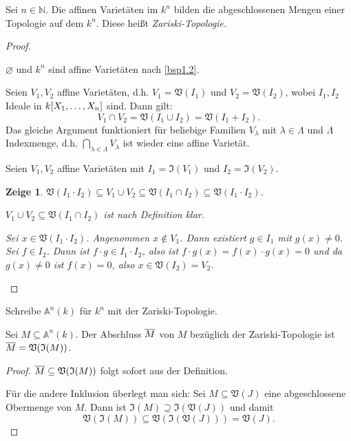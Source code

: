 \documentclass[a4paper,12pt]{scrbook}
\newtheorem{zeige}{Zeige}
\newtheorem{proof}{Beweis}
\def\A{\mathbb{A}}
\def\V{\mathfrak{V}}
\def\I{\mathfrak{I}}
\newcommand{\leer}{\ensuremath{\varnothing}}
\newcommand{\set}[1]{\ensuremath{\mathbb{#1}}}
\newcommand{\N}{\set{N}}
\def\Bar#1{\ensuremath\overline{#1}}
\newcommand{\polyx}[1][n]{\ensuremath%
  [X_{1},\dotsc,X_{#1}]}
\begin{document}
\begin{db}\label{1.2.1}Sei $n\in\N$. Die affinen Varietäten im $k^{n}$ bilden die abgeschlossenen Mengen einer Topologie auf dem $k^{n}$. Diese heißt \emph{Zariski-Topologie}.\end{db}
\begin{proof}\begin{prooflist}
\item $\leer$ und $k^{n}$ sind affine Varietäten nach \cref{bsp1.2}.
\item Seien $V_{1},V_{2}$ affine Varietäten, d.h. $V_{1}=\V(I_{1})$ und $V_{2}=\V(I_{2})$, wobei $I_{1},I_{2}$ Ideale in $k\polyx$ sind. Dann gilt:
\[V_{1}\cap V_{2}=\V(I_{1}\cup I_{2}) = \V(I_{1}+I_{2}).\]
Das gleiche Argument funktioniert für beliebige Familien $V_{\lambda}$ mit $\lambda\in\Lambda$ und $\Lambda$ Indexmenge, d.h. $\displaystyle\bigcap_{\lambda\in\Lambda}V_{\lambda}$ ist wieder eine affine Varietät.
\item Seien $V_{1},V_{2}$ affine Varietäten mit $I_{1}=\I(V_{1})$ und $I_{2}=\I(V_{2})$.
\begin{zeige} $\V(I_{1}\cdot I_{2})\subseteq V_{1}\cup V_{2}\subseteq \V(I_{1}\cap I_{2})\subseteq \V(I_{1}\cdot I_{2})$.
\begin{prooflist}
\item $V_{1}\cup V_{2}\subseteq \V(I_{1}\cap I_{2})$ ist nach Definition klar.
\item Sei $x\in \V(I_{1}\cdot I_{2})$. Angenommen $x\notin V_{1}$. Dann existiert $g\in I_{1}$ mit $g(x)\neq 0$. Sei $f\in I_{2}$. Dann ist $f\cdot g\in I_{1}\cdot I_{2}$, also ist $f\cdot g(x) = f(x)\cdot g(x) = 0$ und da $g(x)\neq 0$ ist $f(x)=0$, also $x\in \V(I_{2})=V_{2}$.
\end{prooflist}\end{zeige}
\end{prooflist}\end{proof}

\begin{dfn}\label{1.2.2}
Schreibe $\A^{n}(k)$ für $k^{n}$ mit der Zariski-Topologie.
\end{dfn}

\begin{bem}\label{1.2.3}
Sei $M\subseteq\A^{n}(k)$. Der Abschluss $\Bar{M}$ von $M$ bezüglich der Zariski-Topologie ist $\Bar{M}=\V(\I(M))$.
\end{bem}
\begin{proof}
$\Bar{M}\subseteq \V(\I(M))$ folgt sofort aus der Definition.

Für die andere Inklusion überlegt man sich: Sei $M\subseteq\V(J)$ eine abgeschlossene Obermenge von $M$. Dann ist $\I(M)\supseteq\I(\V(J))$ und damit
\[\V(\I(M))\subseteq\V(\I(\V(J)))=\V(J).\]
\end{proof}
\end{document}
